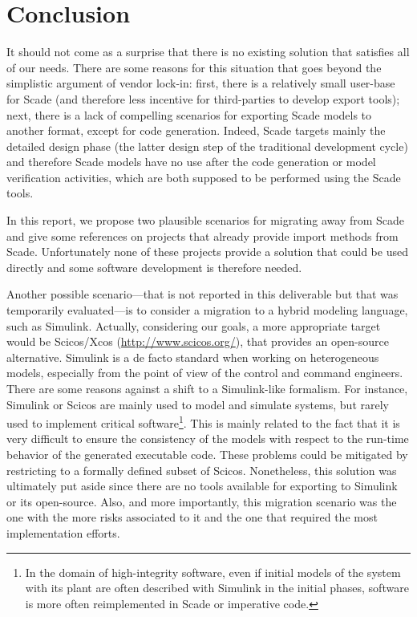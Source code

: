 \documentclass{template/openetcs_report}
\begin{document}
\chapter{Conclusion}


It should not come as a surprise that there is no existing solution
that satisfies all of our needs. There are some reasons for this
situation that goes beyond the simplistic argument of vendor lock-in:
first, there is a relatively small user-base for Scade (and therefore
less incentive for third-parties to develop export tools); next, there
is a lack of compelling scenarios for exporting Scade models to
another format, except for code generation. Indeed, Scade targets
mainly the detailed design phase (the latter design step of the
traditional development cycle) and therefore Scade models have no use
after the code generation or model verification activities, which are
both supposed to be performed using the Scade tools.

In this report, we propose two plausible scenarios for migrating away
from Scade and give some references on projects that already provide
import methods from Scade. Unfortunately none of these projects
provide a solution that could be used directly and some software
development is therefore needed.

Another possible scenario---that is not reported in this deliverable
but that was temporarily evaluated---is to consider a migration to a
hybrid modeling language, such as Simulink. Actually, considering our
goals, a more appropriate target would be Scicos/Xcos
(\url{http://www.scicos.org/}), that provides an open-source
alternative. Simulink is a de facto standard when working on
heterogeneous models, especially from the point of view of the control
and command engineers. There are some reasons against a shift to a
Simulink-like formalism. For instance, Simulink or Scicos are mainly
used to model and simulate systems, but rarely used to implement
critical software\footnote{In the domain of high-integrity software,
  even if initial models of the system with its plant are often
  described with Simulink in the initial phases, software is more
  often reimplemented in Scade or imperative code.}. This is mainly
related to the fact that it is very difficult to ensure the
consistency of the models with respect to the run-time behavior of the
generated executable code.  These problems could be mitigated by
restricting to a formally defined subset of Scicos. Nonetheless, this
solution was ultimately put aside since there are no tools available
for exporting to Simulink or its open-source. Also, and more
importantly, this migration scenario was the one with the more risks
associated to it and the one that required the most implementation
efforts.
\end{document}

